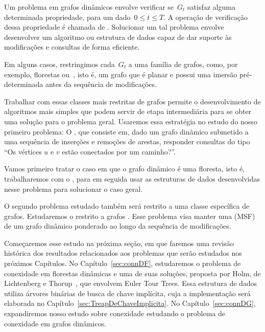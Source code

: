 Um problema em grafos dinâmicos envolve verificar se~$G_t$ satisfaz alguma determinada propriedade, para um dado~$0\leq t\leq T$.
A operação de verificação dessa propriedade é chamada de .
Solucionar um tal problema envolve desenvolver um algoritmo ou estrutura de dados capaz de dar suporte às modificações e consultas de forma eficiente.

Em alguns casos, restringimos cada~$G_t$ a uma família de grafos, como, por exemplo, florestas ou~, isto é, um grafo que é planar e possui uma imersão pré-determinada antes da sequência de modificações.

Trabalhar com essas classes mais restritas de grafos permite o desenvolvimento de algoritmos mais simples que podem servir de etapa intermediária para se obter uma solução para o problema geral.
Usaremos essa estratégia no estudo do nosso primeiro problema:
O , que consiste em, dado um grafo dinâmico submetido a uma sequência de inserções e remoções de arestas, responder consultas do tipo “Os vértices $u$ e $v$ estão conectados por um caminho?”.

Vamos primeiro tratar o caso em que o grafo dinâmico é uma floresta, isto é, trabalharemos com o ,
para em seguida usar as estruturas de dados desenvolvidas nesse problema para solucionar o caso geral.

O segundo problema estudado também será restrito a uma classe específica de grafos.
Estudaremos o  restrito a grafos .
Esse problema visa manter uma  (MSF) de um grafo dinâmico ponderado ao longo da sequência de modificações.

Começaremos esse estudo na próxima seção, em que faremos uma revisão histórica dos resultados relacionados aos problemas que serão estudados nos próximos Capítulos.
No Capítulo~\ref{sec:connDF}, estudaremos o problema de conexidade em florestas dinâmicas e uma de suas soluções, proposta por Holm, de Lichtenberg e Thorup~\cite{poly_log}, que envolvem Euler Tour Trees.
Essa estrutura de dados utiliza árvores binárias de busca de chave implícita, cuja a implementação será elaborada no Capítulo~\ref{sec:TreapDeChaveImplicita}.
No Capítulo~\ref{sec:connDG}, expandiremos nosso estudo sobre conexidade estudando o problema de conexidade em grafos dinâmicos.

